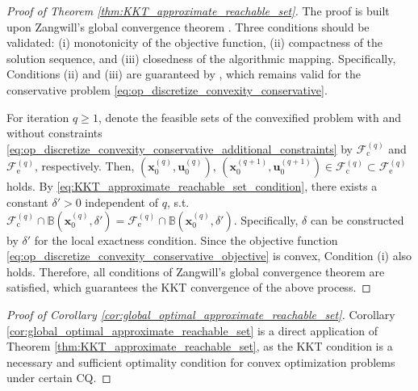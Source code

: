 \documentclass[journal]{IEEEtran}
\theoremstyle{definition}
\theoremstyle{definition}
\newcommand\bx{{\mathbf{x}}}
\newcommand\bu{{\mathbf{u}}}
\begin{document}
\begin{proof}[Proof of Theorem \ref{thm:KKT_approximate_reachable_set}]
    The proof is built upon Zangwill's global convergence theorem \cite[Section 4.5]{zangwill1969nonlinear}. Three conditions should be validated: (i) monotonicity of the objective function, (ii) compactness of the solution sequence, and (iii) closedness of the algorithmic mapping. Specifically, Conditions (ii) and (iii) are guaranteed by \cite{sriperumbudur2009convergence}, which remains valid for the conservative problem \eqref{eq:op_discretize_convexity_conservative}.

    For iteration $q\geq1$, denote the feasible sets of the convexified problem with and without constraints \eqref{eq:op_discretize_convexity_conservative_additional_constraints} by $\mathcal{F}_{\text{c}}^{(q)}$ and $\mathcal{F}_{\text{e}}^{(q)}$, respectively. Then, $(\bx_0^{(q)},\bu_0^{(q)}),\,(\bx_0^{(q+1)},\bu_0^{(q+1)})\in\mathcal{F}_{\text{c}}^{(q)}\subset\mathcal{F}_{\text{e}}^{(q)}$ holds. By \eqref{eq:KKT_approximate_reachable_set_condition}, there exists a constant $\delta'>0$ independent of $q$, s.t. $\mathcal{F}_{\text{c}}^{(q)}\cap\mathbb{B}(\bx_0^{(q)},\delta')=\mathcal{F}_{\text{e}}^{(q)}\cap\mathbb{B}(\bx_0^{(q)},\delta')$. Specifically, $\delta$ can be constructed by $\delta'$ for the local exactness condition. Since the objective function \eqref{eq:op_discretize_convexity_conservative_objective} is convex, Condition (i) also holds. Therefore, all conditions of Zangwill's global convergence theorem are satisfied, which guarantees the KKT convergence of the above process.
\end{proof}

\begin{proof}[Proof of Corollary \ref{cor:global_optimal_approximate_reachable_set}]
    Corollary \ref{cor:global_optimal_approximate_reachable_set} is a direct application of Theorem \ref{thm:KKT_approximate_reachable_set}, as the KKT condition is a necessary and sufficient optimality condition for convex optimization problems under certain CQ.
\end{proof}

\ifCLASSOPTIONcaptionsoff
    \newpage
\fi



\end{document}
